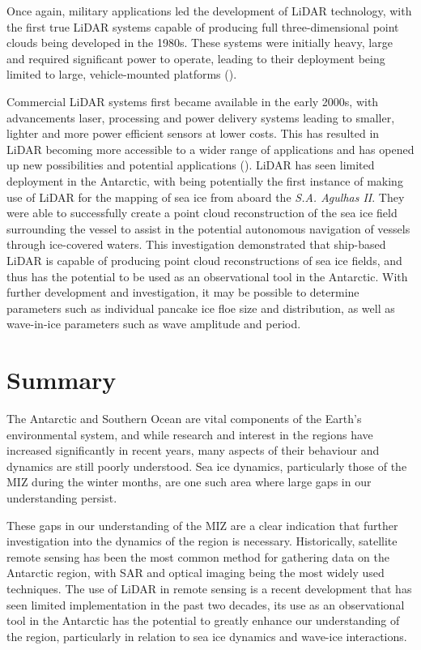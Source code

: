 Once again, military applications led the development of \ac{LiDAR} technology, with the first true \ac{LiDAR} systems capable of producing full three-dimensional point clouds being developed in the 1980s. These systems were initially heavy, large and required significant power to operate, leading to their deployment being limited to large, vehicle-mounted platforms (\cite{molebnyLaserRadarHistorical2016}). 

Commercial \ac{LiDAR} systems first became available in the early 2000s, with advancements laser, processing and power delivery systems leading to smaller, lighter and more power efficient sensors at lower costs. This has resulted in \ac{LiDAR} becoming more accessible to a wider range of applications and has opened up new possibilities and potential applications (\cite{wangEvolutionLiDARIts2020}). \ac{LiDAR} has seen limited deployment in the Antarctic, with \textcite{sandruShipborneSeaiceField2021} being potentially the first instance of making use of \ac{LiDAR} for the mapping of sea ice from aboard the \textit{S.A. Agulhas II}. They were able to successfully create a point cloud reconstruction of the sea ice field surrounding the vessel to assist in the potential autonomous navigation of vessels through ice-covered waters. This investigation demonstrated that ship-based \ac{LiDAR} is capable of producing point cloud reconstructions of sea ice fields, and thus has the potential to be used as an observational tool in the Antarctic. With further development and investigation, it may be possible to determine parameters such as individual pancake ice floe size and distribution, as well as wave-in-ice parameters such as wave amplitude and period.

\section{Summary}
\label{sec:ch2.section5}

The Antarctic and Southern Ocean are vital components of the Earth's environmental system, and while research and interest in the regions have increased significantly in recent years, many aspects of their behaviour and dynamics are still poorly understood. Sea ice dynamics, particularly those of the \ac{MIZ} during the winter months, are one such area where large gaps in our understanding persist. 

These gaps in our understanding of the \ac{MIZ} are a clear indication that further investigation into the dynamics of the region is necessary. Historically, satellite remote sensing has been the most common method for gathering data on the Antarctic region, with \ac{SAR} and optical imaging being the most widely used techniques. The use of \ac{LiDAR} in remote sensing is a recent development that has seen limited implementation in the past two decades, its use as an observational tool in the Antarctic has the potential to greatly enhance our understanding of the region, particularly in relation to sea ice dynamics and wave-ice interactions.

